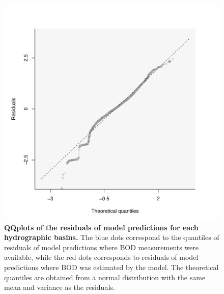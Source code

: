 \documentclass[11pt, oneside]{article}
\begin{document}
\begin{figure}[H]
\begin{center}
\includegraphics[page=1, width=1\linewidth]{scripts/b0_6_3/out_mTL/fig_qqplot_residuals.pdf}
\caption{
    \textbf{QQplots of the residuals of model predictions for each hydrographic basins.}
    The blue dots correspond to the quantiles of residuals of model predictions where BOD measurements were available, while the red dots corresponds to residuals of model predictions where BOD was estimated by the model.
    The theoretical quantiles are obtained from a normal distribution with the same mean and variance as the residuals.
} 
\end{center}
\end{figure}
\end{document}
